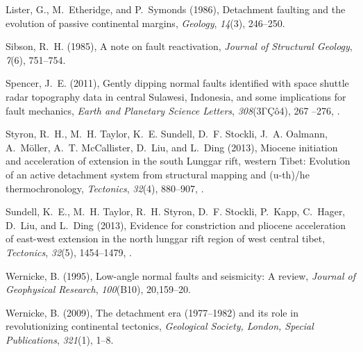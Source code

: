 \documentclass[twocolumn,grl]{AGUTeX}
\begin{document}
\begin{article}
\begin{thebibliography}{28}
Lister, G., M.~Etheridge, and P.~Symonds (1986), Detachment faulting and the
  evolution of passive continental margins, \textit{Geology}, \textit{14}(3),
  246--250.


Sibson, R.~H. (1985), A note on fault reactivation, \textit{Journal of
  Structural Geology}, \textit{7}(6), 751--754.

Spencer, J.~E. (2011), Gently dipping normal faults identified with space
  shuttle radar topography data in central Sulawesi, Indonesia, and some
  implications for fault mechanics, \textit{Earth and Planetary Science
  Letters}, \textit{308}(3ΓÇô4), 267 --276, .

Styron, R.~H., M.~H. Taylor, K.~E. Sundell, D.~F. Stockli, J.~A. Oalmann,
  A.~M{\"o}ller, A.~T. McCallister, D.~Liu, and L.~Ding (2013), Miocene
  initiation and acceleration of extension in the south Lunggar rift, western
  Tibet: Evolution of an active detachment system from structural mapping and
  (u-th)/he thermochronology, \textit{Tectonics}, \textit{32}(4), 880--907,
  .

Sundell, K.~E., M.~H. Taylor, R.~H. Styron, D.~F. Stockli, P.~Kapp, C.~Hager,
  D.~Liu, and L.~Ding (2013), Evidence for constriction and pliocene
  acceleration of east-west extension in the north lunggar rift region of west
  central tibet, \textit{Tectonics}, \textit{32}(5), 1454--1479,
  .

Wernicke, B. (1995), Low-angle normal faults and seismicity: A review,
  \textit{Journal of Geophysical Research}, \textit{100}(B10), 20,159--20.

Wernicke, B. (2009), The detachment era (1977--1982) and its role in
  revolutionizing continental tectonics, \textit{Geological Society, London,
  Special Publications}, \textit{321}(1), 1--8.


\end{thebibliography}
\end{article}
\end{document}

